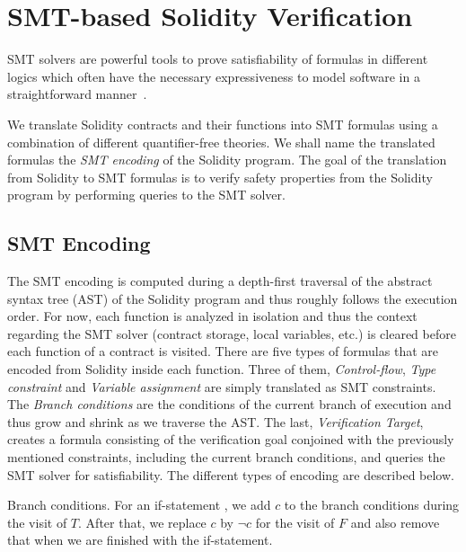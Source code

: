 \section{SMT-based Solidity Verification}
\label{section:smt}

SMT solvers are powerful tools to prove satisfiability of formulas in different
logics which often have the necessary expressiveness to model software in a
straightforward manner~\cite{Komuravelli13,Alt17,Donaldson11,Beyer11}.

We translate Solidity contracts and their functions into SMT formulas using a
combination of different quantifier-free theories.
%
We shall name the translated formulas the \emph{SMT encoding} of the Solidity
program.
%
The goal of the translation from Solidity to SMT formulas is to verify safety
properties from the Solidity program by performing queries to the SMT solver.

\subsection{SMT Encoding}

The SMT encoding is computed during a depth-first traversal of the
abstract syntax tree (AST) of the
Solidity program and thus roughly follows the execution order.
%
For now, each function is analyzed in isolation and thus the 
context regarding the SMT solver (contract storage, local variables, etc.)
is cleared before each function of a contract is visited.
%
There are five types of formulas that are encoded from Solidity inside each function.
%
Three of them, \emph{Control-flow}, \emph{Type constraint} and \emph{Variable assignment}
are simply translated as SMT constraints.
%
The \emph{Branch conditions} are the conditions of the current branch of
execution and thus grow and shrink as we traverse the AST.
%
The last, \emph{Verification Target}, creates a formula consisting of the
verification goal conjoined with the previously mentioned constraints,
including the current branch conditions, and
queries the SMT solver for satisfiability.
%
The different types of encoding are described below.

\begin{paragraph}{Branch conditions.}
For an if-statement , we add
$c$ to the branch conditions during the visit of $T$.
After that, we replace $c$ by $\neg c$
for the visit of $F$ and also remove that when we are
finished with the if-statement.
\end{paragraph}
  
